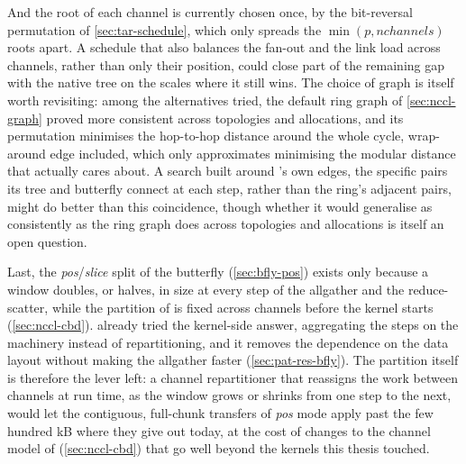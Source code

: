 And the root of each channel is currently chosen once, by the bit-reversal permutation of \cref{sec:tar-schedule}, which only spreads the $\min(p,\mathit{nchannels})$ roots apart. A schedule that also balances the fan-out and the link load across channels, rather than only their position, could close part of the remaining gap with the native tree on the scales where it still wins.
The choice of graph is itself worth revisiting: among the alternatives tried, the default ring graph of \cref{sec:nccl-graph} proved more consistent across topologies and allocations, and its permutation minimises the hop-to-hop distance around the whole cycle, wrap-around edge included, which only approximates minimising the modular distance that \bine{} actually cares about.
A search built around \bine{}'s own edges, the specific pairs its tree and butterfly connect at each step, rather than the ring's adjacent pairs, might do better than this coincidence, though whether it would generalise as consistently as the ring graph does across topologies and allocations is itself an open question.

Last, the \emph{pos}/\emph{slice} split of the butterfly (\cref{sec:bfly-pos}) exists only because a window doubles, or halves, in size at every step of the allgather and the reduce-scatter, while the partition of \nccl{} is fixed across channels before the kernel starts (\cref{sec:nccl-cbd}).
 already tried the kernel-side answer, aggregating the steps on the \pat{} machinery instead of repartitioning, and it removes the dependence on the data layout without making the allgather faster (\cref{sec:pat-res-bfly}).
The partition itself is therefore the lever left: a channel repartitioner that reassigns the work between channels at run time, as the window grows or shrinks from one step to the next, would let the contiguous, full-chunk transfers of \emph{pos} mode apply past the few hundred kB where they give out today, at the cost of changes to the channel model of \nccl{} (\cref{sec:nccl-cbd}) that go well beyond the kernels this thesis touched.
